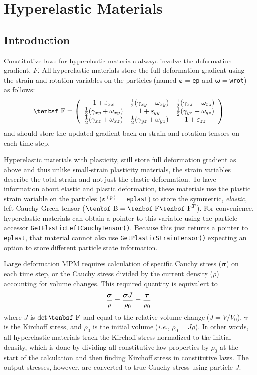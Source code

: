 \documentclass[11pt]{book}
\renewcommand{\vec}[1]{\boldsymbol{#1}}
\def\B{\hbox{\tenbsf B}}
\def\e#1{\varepsilon_{#1}}
\def\ee{\varepsilon}
\def\F{\hbox{\tenbsf F}}
\def\g#1{\gamma_{#1}}
\def\w#1{\omega_{#1}}
\begin{document}
\chapter{Hyperelastic Materials}

\section{Introduction}

Constitutive laws for hyperelastic materials always involve the deformation gradient, $F$. All hyperelastic materials store the full deformation gradient using the strain and rotation variables on the particles (named $\vec\ee=${\tt ep} and $\vec\omega=${\tt wrot}) as follows:
\begin{equation}
   \F = \left(\begin{array}{ccc}
          1 + \e{xx} & {1\over2}(\g{xy}-\w{xy}) & {1\over2}(\g{xz}-\w{xz})   \\
         {1\over2}(\g{xy}+\w{xy})  & 1 + \e{yy} & {1\over2}(\g{yz}-\w{yz})   \\
        {1\over2}(\g{xz}+\w{xz}) & {1\over2}(\g{yz}+\w{yz}) & 1 + \e{zz}
        \end{array}\right)
\end{equation}
and should store the updated gradient back on strain and rotation tensors on each time step.

Hyperelastic materials with plasticity, still store full deformation gradient as above and thus unlike small-strain plasticity materials, the strain variables describe the total strain and not just the elastic deformation. To have information about elastic and plastic deformation, these materials use the plastic strain variable on the particles ($\vec\ee^{(p)}=${\tt eplast}) to store the symmetric, {\em elastic}, left Cauchy-Green tensor ($\B = \F\F^T$). For convenience, hyperelastic materials can obtain a pointer to this variable using the particle accessor {\tt GetElasticLeftCauchyTensor()}. Because this just returns a pointer to {\tt eplast}, that material cannot also use {\tt GetPlasticStrainTensor()} expecting an option to store different particle state information.

Large deformation MPM requires calculation of specific Cauchy stress ($\vec\sigma$) on each time step, or the Cauchy stress divided by the current density ($\rho$) accounting for volume changes. This required quantity is equivalent to
\begin{equation}
              {\vec\sigma\over\rho} = {\vec\sigma J\over\rho_0} =  {\vec\tau\over\rho_0}
\end{equation}
where $J$ is $\det \F$ and equal to the relative volume change ($J = V/V_0$), $\vec\tau$ is the Kirchoff stress, and $\rho_0$ is the initial volume ({\em i.e.}, $\rho_0 = J\rho$). In other words, all hyperelastic materials track the Kirchoff stress normalized to the initial density, which is done by dividing all constitutive law properties by $\rho_0$ at the start of the calculation and then finding Kirchoff stress in constitutive laws. The output stresses, however, are converted to true Cauchy stress using particle $J$.
\end{document}
